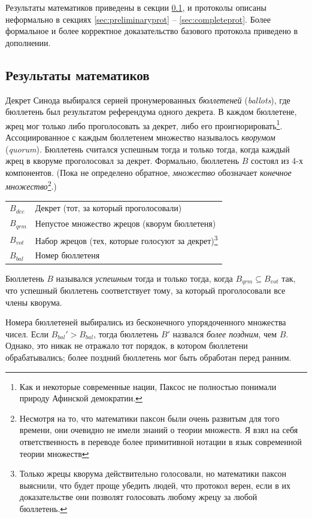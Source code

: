 \documentclass[12pt, a4paper]{article} %
\begin{document}
Результаты математиков приведены в секции \ref{sec:mathsupport}, и протоколы описаны неформально в секциях \ref{sec:preliminaryprot} -- \ref{sec:completeprot}. Более формальное и более корректное доказательство базового протокола приведено в дополнении.
\newpage
\subsection{Результаты математиков}\label{sec:mathsupport}

Декрет Синода выбирался серией пронумерованных \textit{бюллетеней} (\textit{ballots}), где бюллетень был результатом референдума одного декрета. В каждом бюллетене, жрец мог только либо проголосовать за декрет, либо его проигнорировать\footnote{Как и некоторые современные нации, Паксос не полностью понимали природу Афинской демократии.}. Ассоциированное с каждым бюллетенем множество называлось \textit{кворумом} (\textit{quorum}). Бюллетень считался успешным тогда и только тогда, когда каждый жрец в кворуме проголосовал за декрет.  Формально, бюллетень $B$ состоял из 4-х компонентов. (Пока не определено обратное, \textit{множество} обозначает \textit{конечное множество}\footnote{Несмотря на то, что математики паксон были очень развитым для того времени, они очевидно не имели знаний о теории множеств. Я взял на себя ответственность в переводе более примитивной нотации в язык современной теории множеств}.)
\begin{table}[h]
\begin{tabular}{ l p{10.5cm}}
    $B_{dec}$ & Декрет (тот, за который проголосовали)\\
    $B_{qrm}$ & Непустое множество жрецов (кворум бюллетеня)\\
    $B_{vot}$ & Набор жрецов (тех, которые голосуют за декрет)\footnote{Только жрецы кворума действительно голосовали, но математики паксон выяснили, что будет проще убедить людей, что протокол верен, если в их доказательстве они позволят голосовать любому жрецу за любой бюллетень.}\\
    $B_{bal}$ & Номер бюллетеня
\end{tabular}
\end{table}

Бюллетень $B$ назывался \textit{успешным} тогда и только тогда, когда $B_{qrm} \subseteq B_{vot}$ так, что успешный бюллетень соответствует тому, за который проголосовали все члены кворума.

Номера бюллетеней выбирались из бесконечного упорядоченного множества чисел. Если $B_{bal}' > B_{bal}$, тогда бюллетень $B'$ назвался \textit{более поздним}, чем $B$. Однако, это никак не отражало тот порядок, в котором бюллетени обрабатывались; более поздний бюллетень мог быть обработан перед ранним.
\end{document}
